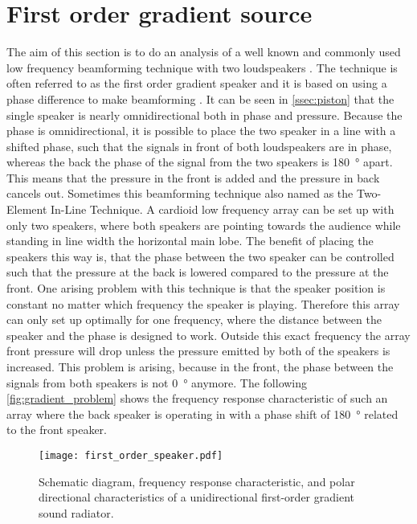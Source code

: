 \section{First order gradient source}\label{sec:first_order_speaker}
The aim of this section is to do an analysis of a well known and commonly used low frequency beamforming technique with two loudspeakers \citep{McCarthy2016}. The technique is often referred to as the first order gradient speaker and it is based on using a phase difference to make beamforming \citep{olson1973gradient}.
It can be seen in \autoref{ssec:piston} that the single speaker is nearly omnidirectional both in phase and pressure. Because the phase is omnidirectional, it is possible to place the two speaker in a line with a shifted phase, such that the signals in front of both loudspeakers are in phase, whereas the back the phase of the signal from the two speakers is \SI{180}{\degree} apart. This means that the pressure in the front is added and the pressure in back cancels out. Sometimes this beamforming technique also named as the Two-Element In-Line Technique. A cardioid low frequency array can be set up with only two speakers, where both speakers are pointing towards the audience while standing in line width the horizontal main lobe. The benefit of placing the speakers this way is, that the phase between the two speaker can be controlled such that the pressure at the back is lowered compared to the pressure at the front. One arising problem with this technique is that the speaker position is constant no matter which frequency the speaker is playing. Therefore this array can only set up optimally for one frequency, where the distance between the speaker and the phase is designed to work. Outside this exact frequency the array front pressure will drop unless the pressure emitted by both of the speakers is increased. This problem is arising, because in the front, the phase between the signals from both speakers is not \SI{0}{\degree} anymore. The following \autoref{fig:gradient_problem} shows the frequency response characteristic of such an array where the back speaker is operating in with a phase shift of \SI{180}{\degree} related to the front speaker.

\begin{figure}[H]
	\centering
	\texttt{[image: first\_order\_speaker.pdf]}
	\caption{Schematic diagram, frequency response characteristic, and polar directional characteristics of a unidirectional first-order gradient sound radiator. \citep{olson1973gradient}}
		\label{fig:gradient_problem}
\end{figure}

